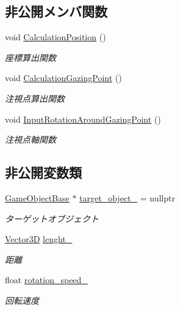 \subsection*{非公開メンバ関数}
\begin{DoxyCompactItemize}
\item 
void \mbox{\hyperlink{class_camera_state___homing_target_ad789fa90b971d23abceb58f5c4018c10}{Calculation\+Position}} ()
\begin{DoxyCompactList}\small\item\em 座標算出関数 \end{DoxyCompactList}\item 
void \mbox{\hyperlink{class_camera_state___homing_target_a322f7f00e295f312265b026c0af143ba}{Calculation\+Gazing\+Point}} ()
\begin{DoxyCompactList}\small\item\em 注視点算出関数 \end{DoxyCompactList}\item 
void \mbox{\hyperlink{class_camera_state___homing_target_a131b0dc7ec8aee7521cf774fe975d314}{Input\+Rotation\+Around\+Gazing\+Point}} ()
\begin{DoxyCompactList}\small\item\em 注視点軸関数 \end{DoxyCompactList}\end{DoxyCompactItemize}
\subsection*{非公開変数類}
\begin{DoxyCompactItemize}
\item 
\mbox{\hyperlink{class_game_object_base}{Game\+Object\+Base}} $\ast$ \mbox{\hyperlink{class_camera_state___homing_target_af9c54d8f2241883f8ed9598288a0185a}{target\+\_\+object\+\_\+}} = nullptr
\begin{DoxyCompactList}\small\item\em ターゲットオブジェクト \end{DoxyCompactList}\item 
\mbox{\hyperlink{class_vector3_d}{Vector3D}} \mbox{\hyperlink{class_camera_state___homing_target_ae6e27c06bb283384fd6fc69bb698e1c3}{lenght\+\_\+}}
\begin{DoxyCompactList}\small\item\em 距離 \end{DoxyCompactList}\item 
float \mbox{\hyperlink{class_camera_state___homing_target_a54dbd3a8de35069e116ae1162298e015}{rotation\+\_\+speed\+\_\+}}
\begin{DoxyCompactList}\small\item\em 回転速度 \end{DoxyCompactList}\end{DoxyCompactItemize}


